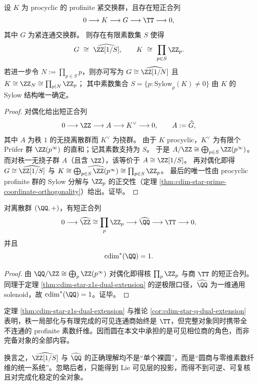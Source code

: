 \begin{corollary}\label{cor:cdim-procyclic-fiber-solenoid-classification}
设 \(K\) 为 procyclic 的 profinite 紧交换群，且存在短正合列
\[
0\longrightarrow K\longrightarrow G\longrightarrow \TT\longrightarrow 0,
\]
其中 \(G\) 为紧连通交换群。
则存在有限素数集 \(S\) 使得
\[
G\ \cong\ \widehat{\ZZ[1/S]},
\qquad
K\ \cong\ \prod_{p\in S}\ZZ_p.
\]
若进一步令 \(N:=\prod_{p\in S}p\)，则亦可写为
\(
G\cong \widehat{\ZZ[1/N]}
\)
且
\(
K\cong \ZZ_N\cong \prod_{p\mid N}\ZZ_p
\)；
其中素数集合 \(S=\{p:\mathrm{Sylow}_p(K)\neq 0\}\) 由 \(K\) 的 Sylow 结构唯一确定。
\end{corollary}
\begin{proof}
对偶化给出短正合列
\[
0\longrightarrow \ZZ\longrightarrow A\longrightarrow K^\vee\longrightarrow 0,
\qquad A:=\widehat G,
\]
其中 \(A\) 为秩 \(1\) 的无挠离散群而 \(K^\vee\) 为挠群。
由于 \(K\) procyclic，\(K^\vee\) 为有限个 Prüfer 群 \(\ZZ(p^\infty)\) 的直和；记其素数支持为 \(S\)。
于是 \(A/\ZZ\cong \bigoplus_{p\in S}\ZZ(p^\infty)\)。
而对秩一无挠子群 \(A\)（且含 \(\ZZ\)），该等价于 \(A\cong \ZZ[1/S]\)。
再对偶化即得 \(G\cong \widehat{\ZZ[1/S]}\) 与
\(
K\cong \widehat{\bigoplus_{p\in S}\ZZ(p^\infty)}\cong \prod_{p\in S}\ZZ_p
\)。
最后的唯一性由 procyclic profinite 群的 Sylow 分解与 \(\ZZ_p\) 的正交性（定理 \ref{thm:cdim-star-prime-coordinate-orthogonality}）给出。证毕。
\end{proof}

\begin{corollary}[有理群的相位圆与全素数纤维分解]\label{cor:cdim-star-q-dual-extension}
对离散群 \((\QQ,+)\)，有短正合列
\[
0\longrightarrow \widehat{\ZZ}\cong\prod_{p}\ZZ_p
\longrightarrow \widehat{\QQ}
\longrightarrow \TT
\longrightarrow 0,
\]
并且
\[
\cdim^\ast(\QQ)=1.
\]
\end{corollary}
\begin{proof}
由
\(
\QQ/\ZZ\cong\bigoplus_p \ZZ(p^\infty)
\)
对偶化即得核 \(\prod_p\ZZ_p\) 与商 \(\TT\) 的短正合列。
同理于定理 \ref{thm:cdim-star-z1s-dual-extension} 的逆极限口径，\(\widehat\QQ\) 为一维通用 solenoid，故 \(\cdim^\ast(\QQ)=1\)。证毕。
\end{proof}

\begin{remark}[完备相位对象并非裸圆]\label{rem:cdim-complete-phase-object-circle-plus-fiber}
定理 \ref{thm:cdim-star-z1s-dual-extension} 与推论 \ref{cor:cdim-star-q-dual-extension} 表明，秩一局部化与有理完成的可见连通商始终是 \(\TT\)，但完整对象同时携带全不连通的 profinite 素数纤维。因而圆在本文中承担的是可见相位商的角色，而非完备对象的全部内容。
\par
换言之，\(\widehat{\ZZ[1/S]}\) 与 \(\widehat\QQ\) 的正确理解均不是“单个裸圆”，而是“圆商与零维素数纤维的统一系统”。忽略后者，只能得到 Lie 可见层的投影，而得不到可逆、可复核且对完成化稳定的全对象。
\end{remark}

